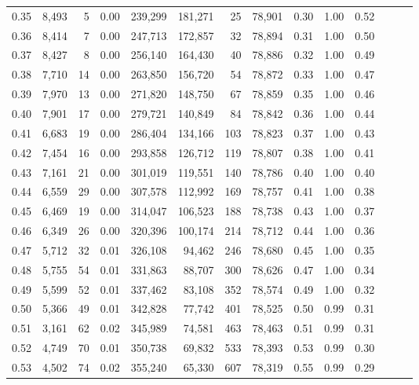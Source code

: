 \begin{tabular}{rrrrrrrrrrrrrr}
0.35 &  8,493 &      5 &  0.00 &  239,299 &  181,271 &      25 &  78,901 &  0.30 &  1.00 &      0.52 \\
0.36 &  8,414 &      7 &  0.00 &  247,713 &  172,857 &      32 &  78,894 &  0.31 &  1.00 &      0.50 \\
0.37 &  8,427 &      8 &  0.00 &  256,140 &  164,430 &      40 &  78,886 &  0.32 &  1.00 &      0.49 \\
0.38 &  7,710 &     14 &  0.00 &  263,850 &  156,720 &      54 &  78,872 &  0.33 &  1.00 &      0.47 \\
0.39 &  7,970 &     13 &  0.00 &  271,820 &  148,750 &      67 &  78,859 &  0.35 &  1.00 &      0.46 \\
0.40 &  7,901 &     17 &  0.00 &  279,721 &  140,849 &      84 &  78,842 &  0.36 &  1.00 &      0.44 \\
0.41 &  6,683 &     19 &  0.00 &  286,404 &  134,166 &     103 &  78,823 &  0.37 &  1.00 &      0.43 \\
0.42 &  7,454 &     16 &  0.00 &  293,858 &  126,712 &     119 &  78,807 &  0.38 &  1.00 &      0.41 \\
0.43 &  7,161 &     21 &  0.00 &  301,019 &  119,551 &     140 &  78,786 &  0.40 &  1.00 &      0.40 \\
0.44 &  6,559 &     29 &  0.00 &  307,578 &  112,992 &     169 &  78,757 &  0.41 &  1.00 &      0.38 \\
0.45 &  6,469 &     19 &  0.00 &  314,047 &  106,523 &     188 &  78,738 &  0.43 &  1.00 &      0.37 \\
0.46 &  6,349 &     26 &  0.00 &  320,396 &  100,174 &     214 &  78,712 &  0.44 &  1.00 &      0.36 \\
0.47 &  5,712 &     32 &  0.01 &  326,108 &   94,462 &     246 &  78,680 &  0.45 &  1.00 &      0.35 \\
0.48 &  5,755 &     54 &  0.01 &  331,863 &   88,707 &     300 &  78,626 &  0.47 &  1.00 &      0.34 \\
0.49 &  5,599 &     52 &  0.01 &  337,462 &   83,108 &     352 &  78,574 &  0.49 &  1.00 &      0.32 \\
0.50 &  5,366 &     49 &  0.01 &  342,828 &   77,742 &     401 &  78,525 &  0.50 &  0.99 &      0.31 \\
0.51 &  3,161 &     62 &  0.02 &  345,989 &   74,581 &     463 &  78,463 &  0.51 &  0.99 &      0.31 \\
0.52 &  4,749 &     70 &  0.01 &  350,738 &   69,832 &     533 &  78,393 &  0.53 &  0.99 &      0.30 \\
0.53 &  4,502 &     74 &  0.02 &  355,240 &   65,330 &     607 &  78,319 &  0.55 &  0.99 &      0.29 \\

\end{tabular}
